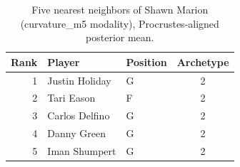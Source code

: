 \begin{table}[htbp]
  \centering\small
  \begin{tabular}{rllc}
    \toprule
    Rank & Player & Position & Archetype \\
    \midrule
    1 & Justin Holiday & G & 2 \\
    2 & Tari Eason & F & 2 \\
    3 & Carlos Delfino & G & 2 \\
    4 & Danny Green & G & 2 \\
    5 & Iman Shumpert & G & 2 \\
    \bottomrule
  \end{tabular}
  \caption{Five nearest neighbors of Shawn Marion (curvature_m5 modality), Procrustes-aligned posterior mean.}
  \label{tab:Shawn_Marion_neighbors_curvature_m5}
\end{table}


